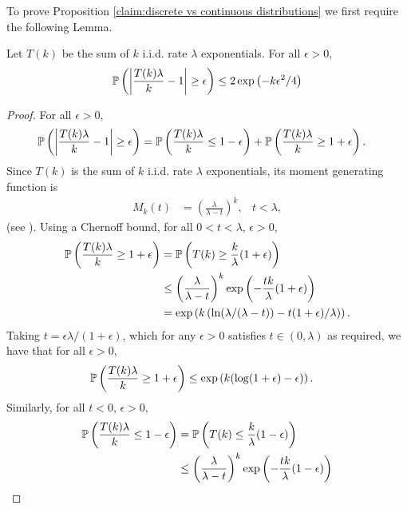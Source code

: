 	To prove Proposition \ref{claim:discrete vs continuous distributions} we first require the following Lemma.
	\begin{lemma}
		\label{lem:T(k) bound}
		Let $T(k)$ be the sum of $k$ i.i.d. rate $\lambda$ exponentials. For all $\epsilon > 0$,
		\begin{equation}
			\mathbb{P}\left(\left|\frac{T(k) \lambda}{k} - 1\right| \geq \epsilon \right) \leq 2 \exp\left(-k \epsilon^2 /4\right)
		\end{equation}
	\end{lemma}
	\begin{proof}
	For all $\epsilon > 0$,
		\begin{align}
			\mathbb{P}\left(\left|\frac{T(k) \lambda}{k} - 1\right| \geq \epsilon \right) &= \mathbb{P}\left(\frac{T(k) \lambda}{k} \leq 1 - \epsilon \right) + \mathbb{P}\left(\frac{T(k) \lambda}{k} \geq 1 + \epsilon \right).
		\end{align}
		Since $T(k)$ is the sum of $k$ i.i.d. rate $\lambda$ exponentials, its moment generating function is 
		\begin{align}
			M_k(t) &= \left(\frac{\lambda}{\lambda - t}\right)^k, &t < \lambda,
		\end{align}
		(see \cite[Example 21.3]{Billingsley1995-en}).
		Using a Chernoff bound, for all $0 <t < \lambda$, $\epsilon > 0$,
		\begin{align}
			\mathbb{P}\left(\frac{T(k) \lambda}{k} \geq 1  + \epsilon\right) &= \mathbb{P}\left(T(k) \geq \frac{k}{\lambda}(1  + \epsilon)\right)\\
			&\leq \left(\frac{\lambda}{\lambda - t}\right)^k \exp\left(-\frac{t k}{\lambda}(1  + \epsilon)\right)\\
			&= \exp\left(k\left(\ln(\lambda/(\lambda - t)) - t(1 + \epsilon)/\lambda\right)\right).
		\end{align}
		Taking $t = \epsilon\lambda/(1+\epsilon)$, which for any $\epsilon > 0$ satisfies $t \in (0, \lambda)$ as required, we have that for all $\epsilon > 0$,
		\begin{align}
			\mathbb{P}\left(\frac{T(k) \lambda}{k} \geq 1  + \epsilon\right) &\leq \exp\left(k(\log(1 + \epsilon) - \epsilon)\right).
		\end{align}
		Similarly, for all $t < 0$, $\epsilon > 0$,
		\begin{align}
			\prob\left(\frac{T(k) \lambda}{k} \leq 1 - \epsilon \right) &= \prob\left(T(k) \leq \frac{k}{\lambda}(1  - \epsilon)\right)\\
			&\leq \left(\frac{\lambda}{\lambda - t}\right)^k \exp\left(-\frac{t k}{\lambda}(1  - \epsilon)\right)\\

\end{align}
\end{proof}
